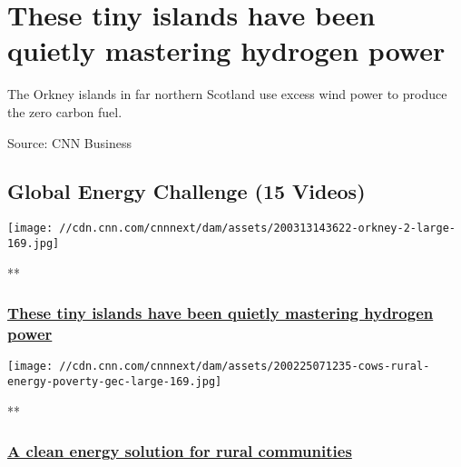 \hypertarget{these-tiny-islands-have-been-quietly-mastering-hydrogen-power}{%
\section{These tiny islands have been quietly mastering hydrogen
power}\label{these-tiny-islands-have-been-quietly-mastering-hydrogen-power}}

The Orkney islands in far northern Scotland use excess wind power to
produce the zero carbon fuel.

Source: CNN Business

\hypertarget{global-energy-challenge-15-videos}{%
\subsection{Global Energy Challenge (15
Videos)}\label{global-energy-challenge-15-videos}}

\href{/videos/business/2020/03/06/orkney-hydrogen-energy-lon-orig.cnn-business/video/playlists/business-global-energy-challenge/}{}

\texttt{[image: //cdn.cnn.com/cnnnext/dam/assets/200313143622-orkney-2-large-169.jpg]}

**

\hypertarget{these-tiny-islands-have-been-quietly-mastering-hydrogen-power-1}{%
\subsubsection{\texorpdfstring{\href{/videos/business/2020/03/06/orkney-hydrogen-energy-lon-orig.cnn-business/video/playlists/business-global-energy-challenge/}{These
tiny islands have been quietly mastering hydrogen
power}}{These tiny islands have been quietly mastering hydrogen power}}\label{these-tiny-islands-have-been-quietly-mastering-hydrogen-power-1}}

\href{/videos/business/2020/02/25/rural-energy-poverty-gec.cnn-business/video/playlists/business-global-energy-challenge/}{}

\texttt{[image: //cdn.cnn.com/cnnnext/dam/assets/200225071235-cows-rural-energy-poverty-gec-large-169.jpg]}

**

\hypertarget{a-clean-energy-solution-for-rural-communities}{%
\subsubsection{\texorpdfstring{\href{/videos/business/2020/02/25/rural-energy-poverty-gec.cnn-business/video/playlists/business-global-energy-challenge/}{A
clean energy solution for rural
communities}}{A clean energy solution for rural communities}}\label{a-clean-energy-solution-for-rural-communities}}

